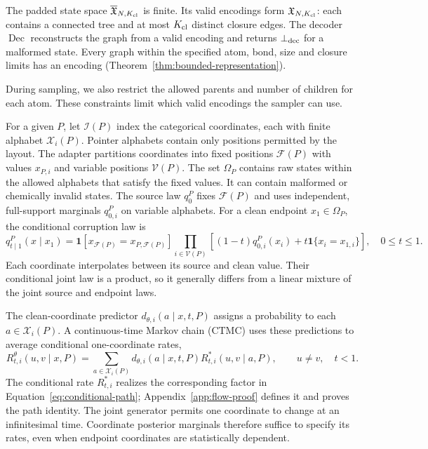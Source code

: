\documentclass{article}
\theoremstyle{definition}
\begin{document}
The padded state space $\overline{\mathfrak X}_{N,K_{\rm cl}}$ is finite. Its valid encodings form $\mathfrak X_{N,K_{\rm cl}}$: each contains a connected tree and at most $K_{\rm cl}$ distinct closure edges. The decoder $\operatorname{Dec}$ reconstructs the graph from a valid encoding and returns $\bot_{\rm dec}$ for a malformed state. Every graph within the specified atom, bond, size and closure limits has an encoding (Theorem~\ref{thm:bounded-representation}). 

During sampling, we also restrict the allowed parents and number of children for each atom. These constraints limit which valid encodings the sampler can use.  

For a given $P$, let $\mathcal I(P)$ index the categorical coordinates, each with finite alphabet
$\mathcal X_i(P)$. Pointer alphabets contain only positions permitted by the layout.
The adapter partitions coordinates into fixed positions $\mathcal F(P)$ with values $x_{P,i}$ and
variable positions $\mathcal V(P)$. The set $\Omega_P$ contains raw states within the allowed alphabets that satisfy the fixed
values. It can contain malformed or chemically invalid states. The source law $q_0^P$ fixes
$\mathcal F(P)$ and uses independent, full-support marginals $q_{0,i}^P$ on variable alphabets.
For a clean endpoint $x_1\in\Omega_P$, the conditional corruption law is
\begin{equation}
    q_{t\mid1}^P(x\mid x_1)
    =\mathbf 1[x_{\mathcal F(P)}=x_{P,\mathcal F(P)}]
    \prod_{i\in\mathcal V(P)}
    \left[(1-t)q_{0,i}^P(x_i)+t\mathbf 1\{x_i=x_{1,i}\}\right],
    \quad 0\leq t\leq1.
    \label{eq:conditional-path}
\end{equation}
Each coordinate interpolates between its source and clean value. Their conditional joint law is a
product, so it generally differs from a linear mixture of the joint source and endpoint laws.

The clean-coordinate predictor $d_{\theta,i}(a\mid x,t,P)$ assigns a probability to each
$a\in\mathcal X_i(P)$. A continuous-time Markov chain (CTMC) uses these predictions to average
conditional one-coordinate rates,
\begin{equation}
 R_{t,i}^\theta(u,v\mid x,P)
 =\sum_{a\in\mathcal X_i(P)}d_{\theta,i}(a\mid x,t,P)
 R^*_{t,i}(u,v\mid a,P),\qquad u\neq v,\quad t<1.
 \label{eq:posterior-rate}
\end{equation}
The conditional rate $R^*_{t,i}$ realizes the corresponding factor in
Equation~\ref{eq:conditional-path}; Appendix~\ref{app:flow-proof} defines it and proves the path
identity. The joint generator permits one coordinate to change at an infinitesimal time.
Coordinate posterior marginals therefore suffice to specify its rates, even when endpoint
coordinates are statistically dependent.
\end{document}
